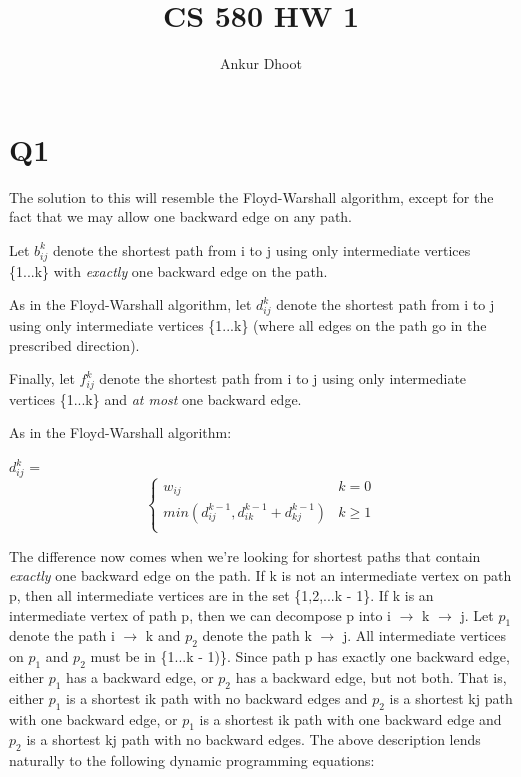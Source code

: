 \documentclass[11pt,a4paper]{article}
\begin{document}
\author{Ankur Dhoot}
\title{CS 580 HW 1}
\maketitle

\section*{Q1}
The solution to this will resemble the Floyd-Warshall algorithm, except for the fact that we may allow one backward edge on any path. 

Let $b_{ij}^{k}$ denote the shortest path from i to j using only intermediate vertices \{1...k\} with \textit{exactly} one backward edge on the path. 

As in the Floyd-Warshall algorithm, let $d_{ij}^{k}$ denote the shortest path from i to j using only intermediate vertices \{1...k\} (where all edges on the path go in the prescribed direction).

Finally, let $f_{ij}^{k}$ denote the shortest path from i to j using only intermediate vertices \{1...k\} and \textit{at most} one backward edge.

As in the Floyd-Warshall algorithm:

$d_{ij}^{k}$ = 
\[ \begin{cases} 
      w_{ij} & k = 0 \\
      min(d_{ij}^{k-1}, d_{ik}^{k-1} + d_{kj}^{k-1}) & k \geq 1 \\
   \end{cases}
\]

The difference now comes when we're looking for shortest paths that contain \textit{exactly} one backward edge on the path. If k is not an intermediate vertex on path p, then all intermediate vertices are in the set \{1,2,...k - 1\}. If k is an intermediate vertex of path p, then we can decompose p into i $\rightarrow$ k $\rightarrow$ j. Let $p_{1}$ denote the path i $\rightarrow$ k and $p_{2}$ denote the path k $\rightarrow$ j. All intermediate vertices on $p_{1}$ and $p_{2}$ must be in  \{1...k - 1)\}. Since path p has exactly one backward edge, either $p_{1}$ has a backward edge, or $p_{2}$ has a backward edge, but not both. That is, either $p_{1}$ is a shortest ik path with no backward edges and $p_{2}$ is a shortest kj path with one backward edge, or $p_{1}$ is a shortest ik path with one backward edge and $p_{2}$ is a shortest kj path with no backward edges. The above description lends naturally to the following dynamic programming equations:
\end{document}
